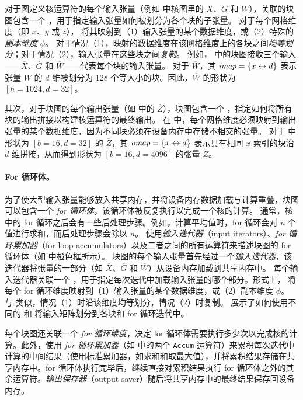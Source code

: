 对于图定义核运算符的每个输入张量（例如  中核图里的 $X$、$G$ 和 $W$），关联的块图包含一个 {\em \imap}，用于指定输入张量如何被划分为各个块的子张量。
对于每个网格维度（即 $x$、$y$ 或 $z$）， 将其映射到（1）输入张量的某个数据维度，或（2）特殊的{\em 副本维度} $\phi$。
对于情况（1），映射的数据维度在该网格维度上的各块之间{\em 均等划分}；对于情况（2），输入张量在这些块之间{\em 复制}。
例如， 中的块图接收三个输入——$\overline{X}$、$\overline{G}$ 和 $\overline{W}$——代表每个块的输入张量。
对于 $\overline{W}$，其 $\mbox{\rm\em imap}=\{x\leftrightarrow d\}$ 表示张量 $W$ 的 $d$ 维被划分为 128 个等大小的块。因此，$\overline{W}$ 的形状为 $[h=1024, d=32]$。

其次，对于块图的每个输出张量（如  中的 $\overline{Z}$），块图包含一个 {\em \omap}，指定如何将所有块的输出拼接以构建核运算符的最终输出。
在 \omap 中，每个网格维度必须映射到输出张量的某个数据维度，因为不同块必须在设备内存中存储不相交的张量。
对于  中形状为 $[b=16, d=32]$ 的 $\overline{Z}$，其 $\mbox{\rm\em omap} =\{x\leftrightarrow d\}$ 表示具有相同 $x$ 索引的块沿 $d$ 维拼接，从而得到形状为 $[b=16, d=4096]$ 的张量 $Z$。

\paragraph{For 循环体。} 为了使大型输入张量能够放入共享内存，并将设备内存数据加载与计算重叠，块图可以包含一个 {\em for 循环体}，该循环体被反复执行以完成一个核的计算。
通常，核中的 for 循环之后会有一些后处理步骤。例如，计算平均值时，for 循环会对 $n$ 个值进行求和，而后处理步骤会除以 $n$。
\Sys 使用{\em 输入迭代器}（input iterators）、{\em for 循环累加器}（for-loop accumulators）以及二者之间的所有运算符来描述块图的 for 循环体（如  中橙色框所示）。
块图的每个输入张量首先经过一个{\em 输入迭代器}，该迭代器将张量的一部分（如 $\overline{X}$、$\overline{G}$ 和 $\overline{W}$）从设备内存加载到共享内存中。
每个输入迭代器关联一个 {\em \fmap}，用于指定每次迭代中加载输入张量的哪个部分。形式上， 将每个 for 循环维度映射到（1）输入张量的某个数据维度，或（2）副本维度 $\phi$。
与 \imap 类似，情况（1）时沿该维度均等划分，情况（2）时复制。
 展示了如何使用不同的 \imap 和 \fmap 将输入矩阵划分到各块和 for 循环迭代中。

每个块图还关联一个 {\em for 循环维度}，决定 for 循环体需要执行多少次以完成核的计算。此外，\sys 使用 {\em for 循环累加器}（如  中的两个 {\tt Accum} 运算符）来累积每次迭代中计算的中间结果（使用标准累加器，如求和和取最大值），并将累积结果存储在共享内存中。for 循环体执行完毕后，\sys 继续直接对累积结果执行 for 循环体之外的其余运算符。{\em 输出保存器}（output saver）随后将共享内存中的最终结果保存回设备内存。

